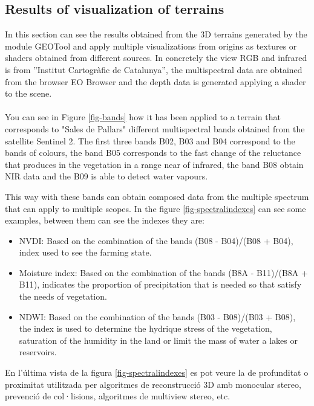 \documentclass[10pt,a4paper,twocolumn,twoside]{article}
\begin{document}
\subsection{Results of visualization of terrains}
In this section can see the results obtained from the 3D terrains generated by the module GEOTool and apply multiple visualizations from origins as textures or shaders obtained from different sources. In concretely the view RGB and infrared is from ''Institut Cartogràfic de Catalunya'', the multispectral data are obtained from the browser EO Browser\cite{eobrowser} and the depth data is generated applying a shader to the scene.
\\
\\
You can see in Figure \ref{fig-bands} how it has been applied to a terrain that corresponds to "Sales de Pallars" different multispectral bands obtained from the satellite Sentinel 2\cite{sentinel2}. The first three bands B02, B03 and B04 correspond to the bands of colours, the band B05 corresponds to the fast change of the reluctance that produces in the vegetation in a range near of infrared, the band B08 obtain NIR\cite{nir} data and the B09 is able to detect water vapours.

This way with these bands can obtain composed data from the multiple spectrum that can apply to multiple scopes. In the figure \ref{fig-spectralindexes} can see some examples, between them can see the indexes they are:

\begin{itemize}
\item 
{
	NVDI\cite{ndvi}: Based on the combination of the bands (B08 - B04)/(B08 + B04), index used to see the farming state.
}
\item
{
	Moisture index\cite{moisture}: Based on the combination of the bands (B8A - B11)/(B8A + B11), indicates the proportion of precipitation that is needed so that satisfy the needs of vegetation.
}
\item
{
	NDWI\cite{ndwi}: Based on the combination of the bands (B03 - B08)/(B03 + B08), the index is used to determine the hydrique stress of the vegetation, saturation of the humidity in the land or limit the mass of water a lakes or reservoirs.
}
\end{itemize} 

En l'última vista de la figura \ref{fig-spectralindexes} es pot veure la de profunditat o proximitat utilitzada per algoritmes de reconstrucció 3D amb monocular stereo, prevenció de col·lisions, algoritmes de multiview stereo, etc.
\end{document}
